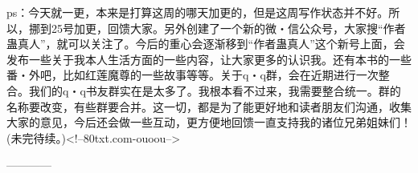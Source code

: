 \begin{this_body}
ps：今天就一更，本来是打算这周的哪天加更的，但是这周写作状态并不好。所以，挪到25号加更，回馈大家。另外创建了一个新的微・信公众号，大家搜“作者蛊真人”，就可以关注了。今后的重心会逐渐移到“作者蛊真人”这个新号上面，会发布一些关于我本人生活方面的一些内容，让大家更多的认识我。还有本书的一些番・外吧，比如红莲魔尊的一些故事等等。关于q・q群，会在近期进行一次整合。我们的q・q书友群实在是太多了。我根本看不过来，我需要整合统一。群的名称要改变，有些群要合并。这一切，都是为了能更好地和读者朋友们沟通，收集大家的意见，今后还会做一些互动，更方便地回馈一直支持我的诸位兄弟姐妹们！(未完待续。)<!--80txt.com-ouoou-->

------------

\end{this_body}

